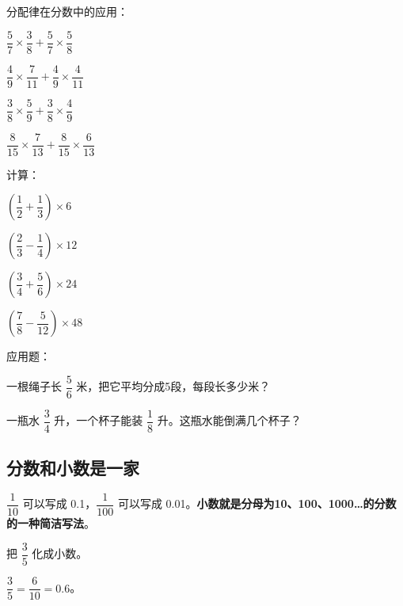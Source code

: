 \begin{exercise}
\item 分配律在分数中的应用：
  \begin{subexercise}
    \item $\dfrac{5}{7}\times\dfrac{3}{8}+\dfrac{5}{7}\times\dfrac{5}{8}$
    \item $\dfrac{4}{9}\times\dfrac{7}{11}+\dfrac{4}{9}\times\dfrac{4}{11}$
    \item $\dfrac{3}{8}\times\dfrac{5}{9}+\dfrac{3}{8}\times\dfrac{4}{9}$
    \item $\dfrac{8}{15}\times\dfrac{7}{13}+\dfrac{8}{15}\times\dfrac{6}{13}$
  \end{subexercise}

\item 计算：
  \begin{subexercise}
    \item $\left(\dfrac{1}{2}+\dfrac{1}{3}\right)\times6$
    \item $\left(\dfrac{2}{3}-\dfrac{1}{4}\right)\times12$
    \item $\left(\dfrac{3}{4}+\dfrac{5}{6}\right)\times24$
    \item $\left(\dfrac{7}{8}-\dfrac{5}{12}\right)\times48$
  \end{subexercise}

\item 应用题：
  \begin{subexercise}
    \item 一根绳子长 $\dfrac{5}{6}$ 米，把它平均分成5段，每段长多少米？
    \item 一瓶水 $\dfrac{3}{4}$ 升，一个杯子能装 $\dfrac{1}{8}$ 升。这瓶水能倒满几个杯子？
  \end{subexercise}
\end{exercise}


\subsection*{分数和小数是一家}

$\dfrac{1}{10}$ 可以写成 0.1，$\dfrac{1}{100}$ 可以写成 0.01。\textbf{小数就是分母为10、100、1000\ldots 的分数的一种简洁写法}。

\begin{example}
把 $\dfrac{3}{5}$ 化成小数。
\end{example}
\begin{solution}
$\dfrac{3}{5} = \dfrac{6}{10} = 0.6$。
\end{solution}

